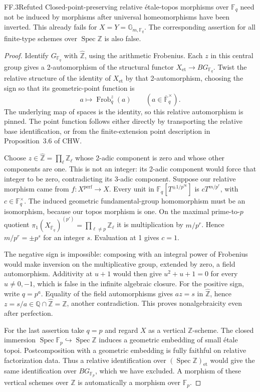 \begin{claim}{FF.3}{Refuted}\label{clm:FF3}
Closed-point-preserving relative \'etale-topos morphisms over
\(\mathbb F_q\) need not be induced by morphisms after universal
homeomorphisms have been inverted. This already fails for
\(X=Y=\mathbb G_{m,\mathbb F_q}\). The corresponding assertion
for all finite-type schemes over \(\operatorname{Spec}\mathbb Z\)
is also false.
\end{claim}
\begin{proof}
Identify \(G_{\mathbb F_q}\) with \(\widehat{\mathbb Z}\), using
the arithmetic Frobenius. Each \(z\) in this central group gives a
2-automorphism of the structural functor
\(X_{\mathrm{et}}\to BG_{\mathbb F_q}\). Twist the relative
structure of the identity of \(X_{\mathrm{et}}\) by that
2-automorphism, choosing the sign so that its geometric-point
function is
\[
          a\longmapsto\operatorname{Frob}_q^z(a)
          \qquad(a\in\overline{\mathbb F}_q^{\times}).
\]
The underlying map of spaces is the identity, so this relative
automorphism is pinned. The point function follows either directly
by transporting the relative base identification, or from the
finite-extension point description in Proposition~3.6 of CHW.

Choose \(z\in\widehat{\mathbb Z}=\prod_\ell\mathbb Z_\ell\)
whose 2-adic component is zero and whose other components are one.
This is not an integer: its 2-adic component would force that integer
to be zero, contradicting its 3-adic component. Suppose our relative
morphism came from
\(f:X^{\mathrm{perf}}\to X\). Every unit in
\(\mathbb F_q[T^{\pm1/p^\infty}]\) is
\(cT^{m/p^r}\), with \(c\in\mathbb F_q^\times\).
The induced geometric fundamental-group homomorphism must be an
isomorphism, because our topos morphism is one. On
the maximal prime-to-\(p\) quotient
\(\pi_1(X_{\overline{\mathbb F}_q})^{(p')}=\prod_{\ell\ne p}\mathbb Z_\ell\)
it is multiplication by \(m/p^r\). Hence
\(m/p^r=\pm p^s\) for an integer \(s\). Evaluation at 1 gives
\(c=1\).

The negative sign is impossible: composing with an integral power
of Frobenius would make inversion on the multiplicative group,
extended by zero, a field automorphism. Additivity at \(u+1\)
would then give \(u^2+u+1=0\) for every
\(u\ne0,-1\), which is false in the infinite algebraic closure.
For the positive sign, write \(q=p^a\). Equality of the field
automorphisms gives \(az=s\) in \(\widehat{\mathbb Z}\), hence
\(z=s/a\in\mathbb Q\cap\widehat{\mathbb Z}=\mathbb Z\), another
contradiction. This proves nonalgebraicity even after perfection.

For the last assertion take \(q=p\) and regard \(X\) as a vertical
\(\mathbb Z\)-scheme. The closed immersion
\(\operatorname{Spec}\mathbb F_p\hookrightarrow
\operatorname{Spec}\mathbb Z\) induces a geometric embedding of
small \'etale topoi. Postcomposition with a geometric embedding is
fully faithful on relative factorization data. Thus a relative
identification over \((\operatorname{Spec}\mathbb Z)_{\mathrm{et}}\)
would give the same identification over \(BG_{\mathbb F_p}\), which
we have excluded. A morphism of these vertical schemes over
\(\mathbb Z\) is automatically a morphism over \(\mathbb F_p\).
\end{proof}

